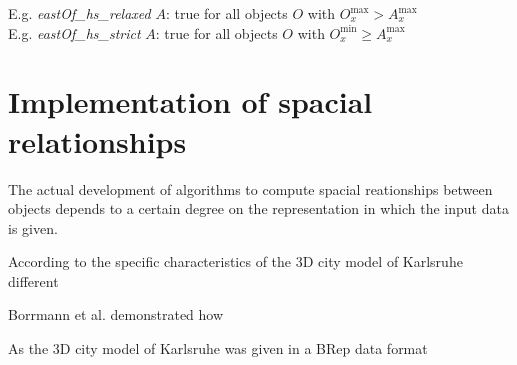 \documentclass[paper=a4, fontsize=11pt]{scrartcl} %
\numberwithin{equation}{section} %
\numberwithin{figure}{section} %
\numberwithin{table}{section} %
\begin{document}
E.g. \textit{eastOf\_hs\_relaxed} $A$:
true for all objects $O$ with $O_x^{\mathrm{max}} > A_x^{\mathrm{max}}$\\
E.g. \textit{eastOf\_hs\_strict} $A$:
true for all objects $O$ with $O_x^{\mathrm{min}} \ge A_x^{\mathrm{max}}$ 





 
\section{Implementation of spacial relationships}
The actual development of algorithms to compute spacial reationships between objects depends to a certain degree on the representation in which the input data is given. 

According to the specific characteristics of the 3D city model of Karlsruhe different 




Borrmann et al. \cite{Daum2014} demonstrated how 









As the 3D city model of Karlsruhe was given in a BRep data format 





{}

\end{document}
